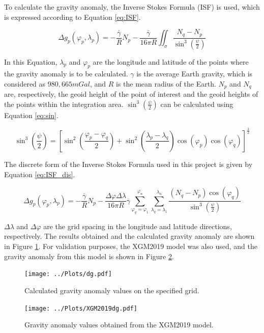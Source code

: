 \documentclass[12pt]{article}
\begin{document}
	To calculate the gravity anomaly, the Inverse Stokes Formula (ISF) is used, which is expressed according to Equation \ref{eq:ISF}.
	
	\begin{equation}
		\Delta g_p(\varphi_p, \lambda_p) = - \frac{\bar{\gamma}}{R} N_p 
		- \frac{\bar{\gamma}}{16 \pi R} \iint_\sigma \frac{N_q - N_p}{\sin^3 \left(\frac{\psi}{2}\right)} 
		\label{eq:ISF}		
	\end{equation}
	
	In this Equation, $\lambda_p$ and $\varphi_p$ are the longitude and latitude of the points where the gravity anomaly is to be calculated. $\gamma$ is the average Earth gravity, which is considered as $980,665 mGal$, and $R$ is the mean radius of the Earth. $N_p$ and $N_q$ are, respectively, the geoid height of the point of interest and the geoid heights of the points within the integration area. $\sin^3 \left(\frac{\psi}{2}\right)$ can be calculated using Equation \ref{eq:sin}.

	\begin{equation}
		\sin^3\left(\frac{\psi}{2}\right) = \left[\sin^2\left(\frac{\varphi_p - \varphi_q}{2}\right) + \sin^2\left(\frac{\lambda_p - \lambda_q}{2}\right) \cos(\varphi_p)\cos(\varphi_q)\right]^{\frac{3}{2}}
		\label{eq:sin}
	\end{equation}

	The discrete form of the Inverse Stokes Formula used in this project is given by Equation \ref{eq:ISF_dis}.
	
	\begin{equation}
		\Delta g_p(\varphi_p, \lambda_p) = 
		- \frac{\overline{\gamma}}{R} N_p 
		- \frac{\Delta \varphi \Delta \lambda}{16 \pi R} \overline{\gamma}
		\sum_{\varphi_q = \varphi_1}^{\varphi_n} 
		\sum_{\lambda_q = \lambda_1}^{\lambda_n} 
		\frac{(N_q - N_p) \cos(\varphi_q)}
		{\sin^3 \left( \frac{\psi}{2} \right)}
		\label{eq:ISF_dis}
	\end{equation}
	
	$\Delta \lambda$ and $\Delta \varphi$ are the grid spacing in the longitude and latitude directions, respectively. The results obtained and the calculated gravity anomaly are shown in Figure \ref{fig:dg}. For validation purposes, the XGM2019 model was also used, and the gravity anomaly from this model is shown in Figure \ref{fig:XGM2019}. 
	
	\clearpage
	
	\begin{figure}[h!]
		\centering
		\texttt{[image: ../Plots/dg.pdf]}
		\caption{Calculated gravity anomaly values on the specified grid.}
		\label{fig:dg}
	\end{figure}
	
	
	\begin{figure}[h!]
		\centering
		\texttt{[image: ../Plots/XGM2019dg.pdf]}
		\caption{Gravity anomaly values obtained from the XGM2019 model.}
		\label{fig:XGM2019}
	\end{figure}
	
\end{document}
